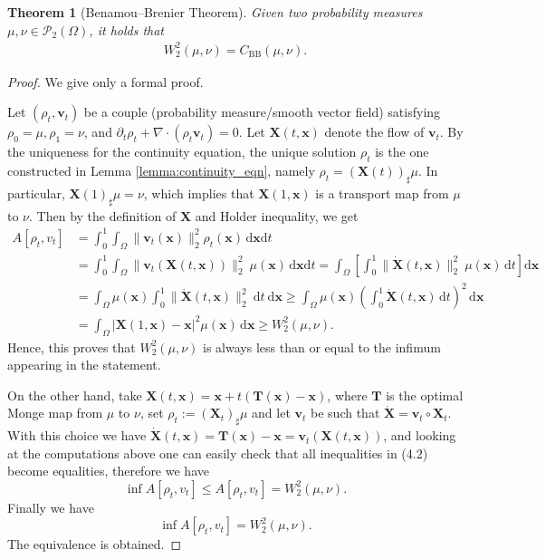 \documentclass[11pt]{book}
\newtheorem{theorem}{Theorem}[section]
\newcommand{\dx}{\mathrm{d}\mathbf{x}}
\newcommand{\dt}{\mathrm{d}t}
\newcommand{\bv}{\mathbf v}
\begin{document}
\begin{theorem}[Benamou--Brenier Theorem]\label{theorem:BB}
Given two probability measures $\mu, \nu \in \mathcal{P}_2(\Omega)$, it holds that
\begin{align}\label{eqn:dynamicalOT}
W_2^2(\mu, \nu) = C_{\mathrm{BB}}(\mu,\nu).
\end{align}
\end{theorem}

\begin{proof}
We give only a formal proof.

Let $(\rho_t, \bv_t)$ be a couple (probability measure/smooth vector field) satisfying $\rho_0 = \mu, \rho_1 = \nu$, and $\partial_t \rho_t + \nabla\cdot(\rho_t \bv_t) = 0$. Let $\mathbf{X}(t, \mathbf{x})$ denote the flow of $\mathbf{v}_t$. By the uniqueness for the continuity equation, the unique solution $\rho_t$ is the one constructed in Lemma \ref{lemma:continuity_eqn}, namely $\rho_t = (\mathbf{X}(t))_\sharp \mu$. In particular, $\mathbf{X}(1)_\sharp \mu = \nu$, which implies that $\mathbf{X}(1,\mathbf{x})$ is a transport map from $\mu$ to $\nu$. Then by the definition of $\mathbf{X}$ and Holder inequality, we get
\begin{align}
A[\rho_t, v_t] &= \int_0^1 \int_{\Omega} \|\mathbf{v}_t(\mathbf{x})\|_2^2 \rho_t(\mathbf{x}) \, \dx\dt \nonumber\\
&= \int_0^1 \int_{\Omega} \|\mathbf{v}_t(\mathbf{X}(t,\mathbf{x}))\|_2^2 \ \mu(\mathbf{x}) \, \dx\dt = \int_{\Omega} \left[ \int_0^1 \|\dot{\mathbf{X}}(t,\mathbf{x})\|_2^2 \ \mu(\mathbf{x}) \, \dt \right] \dx \\
&= \int_{\Omega} \mu(\mathbf{x}) \int_0^1 \|\dot{\mathbf{X}}(t,\mathbf{x})\|_2^2 \ \dt\ \dx 
\geq \int_{\Omega} \mu(\mathbf{x}) \left(\int_0^1 \dot{\mathbf{X}}(t,\mathbf{x}) \, \dt \right)^2 \, \dx \nonumber \\
&= \int_{\Omega}  |\mathbf{X}(1,\mathbf{x}) - \mathbf{x}|^2 \mu(\mathbf{x})\, \dx \geq W^2_2(\mu, \nu). \nonumber
\end{align}
Hence, this proves that $W^2_2(\mu, \nu)$ is always less than or equal to the infimum appearing in the statement.

On the other hand, take \( \mathbf{X}(t,\mathbf{x}) = \mathbf{x} + t(\mathbf{T}(\mathbf{x}) - \mathbf{x}) \), where \( \mathbf{T} \) is the optimal Monge map from \( \mu \) to \( \nu \), set \( \rho_t := (\mathbf{X}_t)_\sharp \mu \) and let \( \mathbf{v}_t \) be such that \( \dot{\mathbf{X}} = \mathbf{v}_t \circ \mathbf{X}_t \). With this choice we have \( \dot{\mathbf{X}}(t,\mathbf{x}) = \mathbf{T}(\mathbf{x}) - \mathbf{x} = \mathbf{v}_t(\mathbf{X}(t,\mathbf{x})) \), and looking at the computations above one can easily check that all inequalities in (4.2) become equalities, therefore we have
\[
\inf A[\rho_t, v_t] \le A[\rho_t, v_t] = W_2^2(\mu,\nu).
\]
Finally we have
\[
\inf A[\rho_t, v_t] = W^2_2(\mu, \nu).
\]
The equivalence is obtained.
\end{proof}
\end{document}
